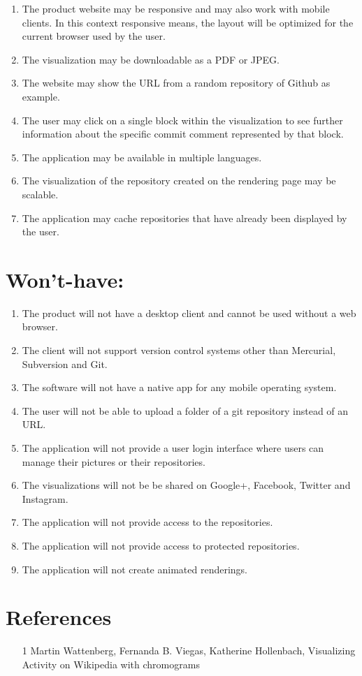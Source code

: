 \documentclass[12pt]{scrartcl}
\begin{document}
\begin{enumerate}
\item The product website may be responsive and may also work with mobile clients. In this context responsive means, the layout will be optimized for the current browser used by the user.
\item The visualization may be downloadable as a PDF or JPEG.
\item The website may show the URL from a random repository of Github as example. 
\item The user may click on a single block within the visualization to see further information about the specific commit comment represented by that block.
\item The application may be available in multiple languages.
\item The visualization of the repository created on the rendering page may be scalable.
\item The application may cache repositories that have already been displayed by the user.
\end{enumerate}
\section{Won't-have:}
\begin{enumerate}
\item The product will not have a desktop client and cannot be used without a web browser.
\item The client will not support version control systems other than Mercurial, Subversion and Git.
\item The software will not have a native app for any mobile operating system.
\item The user will not be able to upload a folder of a git repository instead of an URL.
\item The application will not provide a user login interface where users can manage their pictures or their repositories.
\item The visualizations will not be be shared on Google+, Facebook, Twitter and Instagram.
\item The application will not provide access to the repositories.
\item The application will not provide access to protected repositories.
\item The application will not create animated renderings.
\end{enumerate}
\section{References}
\begin{enumerate}
\item[1] Martin Wattenberg, Fernanda B. Viegas, Katherine Hollenbach,  Visualizing Activity on Wikipedia with chromograms
\end{enumerate}
\end{document}
